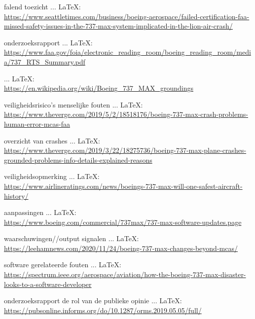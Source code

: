 \begin{thebibliography}{99}
{{{    falend toezicht
     ... \LaTeX:\\ \url{https://www.seattletimes.com/business/boeing-aerospace/failed-certification-faa-missed-safety-issues-in-the-737-max-system-implicated-in-the-lion-air-crash/}
    
    onderzoeksrapport
     ... \LaTeX:\\ \url{https://www.faa.gov/foia/electronic_reading_room/boeing_reading_room/media/737_RTS_Summary.pdf}
    
     ... \LaTeX:\\ \url{https://en.wikipedia.org/wiki/Boeing_737_MAX_groundings}
    
    veiligheidsrisico's
    menselijke fouten
     ... \LaTeX:\\ \url{https://www.theverge.com/2019/5/2/18518176/boeing-737-max-crash-problems-human-error-mcas-faa}
    
    overzicht van crashes
     ... \LaTeX:\\ \url{https://www.theverge.com/2019/3/22/18275736/boeing-737-max-plane-crashes-grounded-problems-info-details-explained-reasons}
    
    veiligheidsopmerking
     ... \LaTeX:\\ \url{https://www.airlineratings.com/news/boeings-737-max-will-one-safest-aircraft-history/}
    
    aanpassingen
     ... \LaTeX:\\ \url{https://www.boeing.com/commercial/737max/737-max-software-updates.page}
    
    waarschuwingen//output signalen
     ... \LaTeX:\\ \url{https://leehamnews.com/2020/11/24/boeing-737-max-changes-beyond-mcas/}
    
    software gerelateerde fouten
     ... \LaTeX:\\ \url{https://spectrum.ieee.org/aerospace/aviation/how-the-boeing-737-max-disaster-looks-to-a-software-developer}
    
    onderzoeksrapport
    de rol van de publieke opinie
     ... \LaTeX:\\ \url{https://pubsonline.informs.org/do/10.1287/orms.2019.05.05/full/}
    
}}}
\end{thebibliography}
